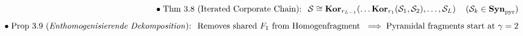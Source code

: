 \documentclass[preview]{standalone}
\begin{document}
\begin{align*}
\special{dvisvgm:raw <g id='unique000'>}\bullet\;\text{Thm 3.8 (Iterated Corporate Chain): }\; \mathcal{S} \cong \mathbf{Kor}_{r_{L-1}}\!\left(\dots\mathbf{Kor}_{r_1}(\mathcal{S}_1,\mathcal{S}_2),\dots,\mathcal{S}_L\right) \quad (\mathcal{S}_k\in\mathbf{Syn}_{\text{pyr}})\\[4pt]\bullet\;\text{Prop 3.9 (\textit{Enthomogenisierende Dekomposition}): }\; \text{Removes shared }F_1\text{ from Homogenfragment }\implies\text{Pyramidal fragments start at }\gamma=2\special{dvisvgm:raw </g>}
\end{align*}
\end{document}
